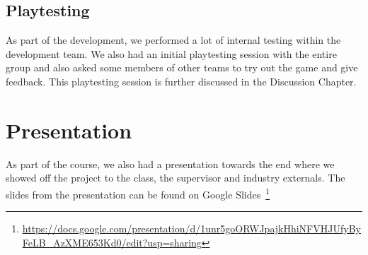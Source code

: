 \subsection{Playtesting}
As part of the development, we performed a lot of internal testing within the development team. We also had an initial playtesting session with the entire group and also asked some members of other teams to try out the game and give feedback. This playtesting session is further discussed in the Discussion Chapter.

\section{Presentation}
As part of the course, we also had a presentation towards the end where we showed off the project to the class, the supervisor and industry externals. The slides from the presentation can be found on Google Slides~\footnote{\url{https://docs.google.com/presentation/d/1unr5goORWJpajkHhiNFVHJUfyByFeLB_AzXME653Kd0/edit?usp=sharing}}
